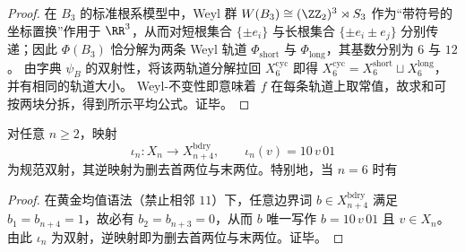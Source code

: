 \begin{proof}
在 \(B_3\) 的标准根系模型中，Weyl 群 \(W(B_3)\cong (\ZZ_2)^3\rtimes S_3\) 作为“带符号的坐标置换”作用于 \(\RR^3\)，从而对短根集合 \(\{\pm e_i\}\) 与长根集合 \(\{\pm e_i\pm e_j\}\) 分别传递；因此 \(\Phi(B_3)\) 恰分解为两条 Weyl 轨道 \(\Phi_{\mathrm{short}}\) 与 \(\Phi_{\mathrm{long}}\)，其基数分别为 \(6\) 与 \(12\)。
由字典 \(\psi_B\) 的双射性，将该两轨道分解拉回 \(X_6^{\mathrm{cyc}}\) 即得 \(X_6^{\mathrm{cyc}}=X_6^{\mathrm{short}}\sqcup X_6^{\mathrm{long}}\)，并有相同的轨道大小。
Weyl-不变性即意味着 \(f\) 在每条轨道上取常值，故求和可按两块分拆，得到所示平均公式。证毕。
\end{proof}

\begin{theorem}\label{thm:boundary-shift4-uplift-isomorphism}
对任意 \(n\ge 2\)，映射
\[
\iota_n:X_n\to X_{n+4}^{\mathrm{bdry}},\qquad \iota_n(v)=10\,v\,01
\]
为规范双射，其逆映射为删去首两位与末两位。特别地，当 \(n=6\) 时有

\end{theorem}
\begin{proof}
在黄金均值语法（禁止相邻 \(11\)）下，任意边界词 \(b\in X_{n+4}^{\mathrm{bdry}}\) 满足 \(b_1=b_{n+4}=1\)，故必有 \(b_2=b_{n+3}=0\)，从而 \(b\) 唯一写作 \(b=10\,v\,01\) 且 \(v\in X_n\)。
由此 \(\iota_n\) 为双射，逆映射即为删去首两位与末两位。证毕。
\end{proof}

